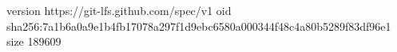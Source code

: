 version https://git-lfs.github.com/spec/v1
oid sha256:7a1b6a0a9e1b4fb17078a297f1d9ebc6580a000344f48c4a80b5289f83df96e1
size 189609
